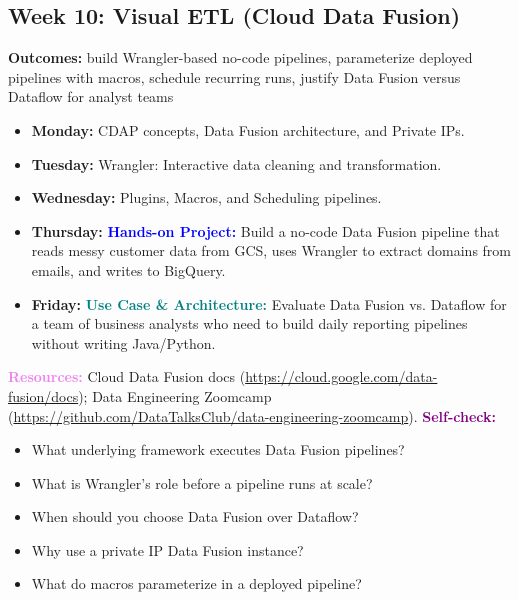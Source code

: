 \documentclass[11pt, a4paper]{article}
\newcommand{\project}[1]{\vspace{1mm}\noindent\textbf{\textcolor{blue}{Hands-on Project:}} #1}
\newcommand{\usecase}[1]{\vspace{1mm}\noindent\textbf{\textcolor{teal}{Use Case \& Architecture:}} #1}
\newcommand{\dayitem}[2]{\item \textbf{#1:} #2}
\newcommand{\resources}[1]{\vspace{1mm}\noindent\textbf{\textcolor{violet}{Resources:}} #1}
\newcommand{\selfcheck}[1]{\vspace{1mm}\noindent\textbf{\textcolor{purple}{Self-check:}} #1}
\begin{document}
\subsection*{Week 10: Visual ETL (Cloud Data Fusion)}
\par\noindent\textbf{Outcomes:} build Wrangler-based no-code pipelines, parameterize deployed pipelines with macros, schedule recurring runs, justify Data Fusion versus Dataflow for analyst teams
\begin{itemize}[label=-]
    \dayitem{Monday}{CDAP concepts, Data Fusion architecture, and Private IPs.}
    \dayitem{Tuesday}{Wrangler: Interactive data cleaning and transformation.}
    \dayitem{Wednesday}{Plugins, Macros, and Scheduling pipelines.}
    \dayitem{Thursday}{\project{Build a no-code Data Fusion pipeline that reads messy customer data from GCS, uses Wrangler to extract domains from emails, and writes to BigQuery.}}
    \dayitem{Friday}{\usecase{Evaluate Data Fusion vs. Dataflow for a team of business analysts who need to build daily reporting pipelines without writing Java/Python.}}
\end{itemize}
\resources{Cloud Data Fusion docs (\url{https://cloud.google.com/data-fusion/docs}); Data Engineering Zoomcamp (\url{https://github.com/DataTalksClub/data-engineering-zoomcamp}).}
\selfcheck{\begin{itemize}[label=-, nosep, leftmargin=1.5em]
    \item What underlying framework executes Data Fusion pipelines?
    \item What is Wrangler's role before a pipeline runs at scale?
    \item When should you choose Data Fusion over Dataflow?
    \item Why use a private IP Data Fusion instance?
    \item What do macros parameterize in a deployed pipeline?
\end{itemize}}
\end{document}
